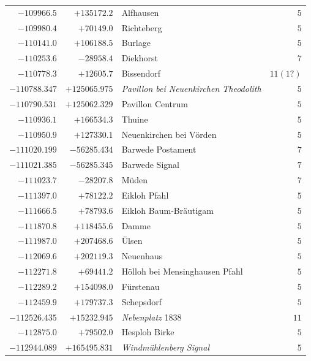 \begin{center}
\begin{tabular}{r|r|p{170pt}|r}
\(-109966.5\)&\(+135172.2\)&Alfhausen&\(5\)\\
\(-109980.4\)&\(+70149.0\)&Richteberg&\(5\)\\
\(-110141.0\)&\(+106188.5\)&Burlage&\(5\)\\
\(-110253.6\)&\(-28958.4\)&Diekhorst&\(7\)\\
\(-110778.3\)&\(+12605.7\)&Bissendorf&\(11(1?)\)\\
\(-110788.347\)&\(+125065.975\)&\textit{Pavillon bei Neuenkirchen Theodolith}&\(5\)\\
\(-110790.531\)&\(+125062.329\)&Pavillon Centrum&\(5\)\\
\(-110936.1\)&\(+166534.3\)&Thuine&\(5\)\\
\(-110950.9\)&\(+127330.1\)&Neuenkirchen bei Vörden&\(5\)\\
\(-111020.199\)&\(-56285.434\)&Barwede Postament&\(7\)\\
\(-111021.385\)&\(-56285.345\)&Barwede Signal&\(7\)\\
\(-111023.7\)&\(-28207.8\)&Müden&\(7\)\\
\(-111397.0\)&\(+78122.2\)&Eikloh Pfahl&\(5\)\\
\(-111666.5\)&\(+78793.6\)&Eikloh Baum-Bräutigam&\(5\)\\
\(-111870.8\)&\(+118455.6\)&Damme&\(5\)\\
\(-111987.0\)&\(+207468.6\)&Ülsen&\(5\)\\
\(-112069.6\)&\(+202119.3\)&Neuenhaus&\(5\)\\
\(-112271.8\)&\(+69441.2\)&Hölloh bei Mensinghausen Pfahl&\(5\)\\
\(-112289.2\)&\(+154098.0\)&Fürstenau&\(5\)\\
\(-112459.9\)&\(+179737.3\)&Schepsdorf&\(5\)\\
\(-112526.435\)&\(+15232.945\)&\textit{Nebenplatz} 1838&\(11\)\\
\(-112875.0\)&\(+79502.0\)&Hesploh Birke&\(5\)\\
\(-112944.089\)&\(+165495.831\)&\textit{Windmühlenberg Signal}&\(5\)\\
\hline\end{tabular}\endgroup\end{center}
